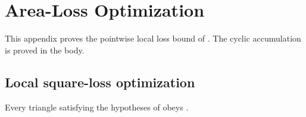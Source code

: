 \section{Area-Loss Optimization}
\label{sec:area-loss-optimization}

This appendix proves the pointwise local loss bound of
. The cyclic accumulation is proved in the body.

\subsection{Local square-loss optimization}

\begin{lemma}
\label{lem:appendix-local-square-loss}
Every triangle satisfying the hypotheses of 
obeys .
\end{lemma}

